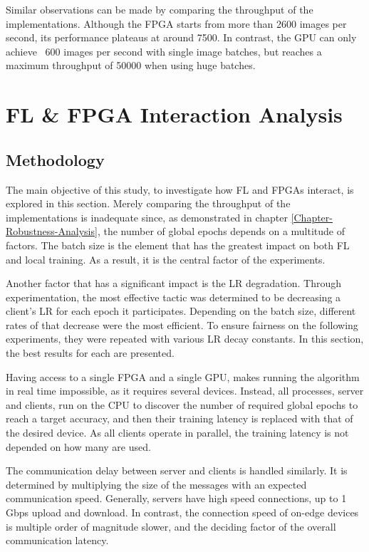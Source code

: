 Similar observations can be made by comparing the throughput of the implementations. Although the FPGA starts from more than 2600 images per second, its performance plateaus at around 7500. In contrast, the GPU can only achieve ~600 images per second with single image batches, but reaches a maximum throughput of 50000 when using huge batches.

\section{FL \& FPGA Interaction Analysis}
\subsection{Methodology}
The main objective of this study, to investigate how FL and FPGAs interact, is explored in this section. Merely comparing the throughput of the implementations is inadequate since, as demonstrated in chapter \ref{Chapter-Robustness-Analysis}, the number of global epochs depends on a multitude of factors. The batch size is the element that has the greatest impact on both FL and local training. As a result, it is the central factor of the experiments. %

Another factor that has a significant impact is the LR degradation. Through experimentation, the most effective tactic was determined to be decreasing a client's LR for each epoch it participates. Depending on the batch size, different rates of that decrease were the most efficient. To ensure fairness on the following experiments, they were repeated with various LR decay constants. In this section, the best results for each are presented. %

Having access to a single FPGA and a single GPU, makes running the algorithm in real time impossible, as it requires several devices. Instead, all processes, server and clients, run on the CPU to discover the number of required global epochs to reach a target accuracy, and then their training latency is replaced with that of the desired device. As all clients operate in parallel, the training latency is not depended on how many are used. %

The communication delay between server and clients is handled similarly. It is determined by multiplying the size of the messages with an expected communication speed. Generally, servers have high speed connections, up to 1 Gbps upload and download. In contrast, the connection speed of on-edge devices is multiple order of magnitude slower, and the deciding factor of the overall communication latency. %

